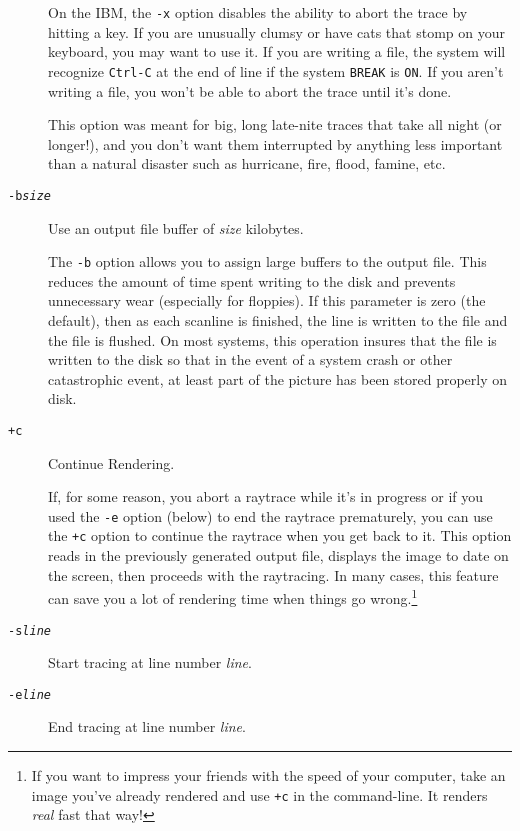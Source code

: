 \begin{description}
On the IBM, the {\tt -x} option disables the ability to abort the
trace by hitting a key.  If you are unusually clumsy or have
cats that stomp on your keyboard, you
may want to use it.  If you are writing a file, the system
will recognize {\tt Ctrl-C} at the end of line if the system {\tt BREAK}
is {\tt ON}.  If you aren't writing a file, you won't be able to
abort the trace until it's done.

This option was meant for big, long late-nite traces that take
all night (or longer!), and you don't want them interrupted by
anything less important than a natural disaster such as hurricane,
fire, flood, famine, etc.

\item[{\tt -b{\em size}}] %
Use an output file buffer of
{\em size} kilobytes.

The {\tt -b} option allows you to assign large buffers to the output
file.  This reduces the amount of time spent writing to the
disk and prevents unnecessary wear (especially for floppies). 
If this parameter is zero (the default), then as each scanline is finished,
the line is written to the file and the file is flushed.  On
most systems, this operation insures that the file is written
to the disk so that in the event of a system crash or other
catastrophic event, at least part of the picture has been
stored properly on disk.

\item[{\tt +c}] Continue Rendering.

If, for some reason, you abort a raytrace while it's in progress
or if you used the {\tt -e} option (below) to end the raytrace
prematurely, you can use the {\tt +c} option to continue the raytrace
when you get back to it.  This option reads in the previously
generated output file, displays the image to date on the screen,
then proceeds with the raytracing.  In many cases, this feature
can save you a lot of rendering time when things go wrong.\footnote{If
you want to impress your friends with the speed of your
computer, take an image you've already rendered and use {\tt +c}
in the command-line.  It renders {\em real} fast that way!}

\item[{\tt -s{\em line}}] %
Start tracing at line number {\em line}.
\noitemsep
\item[{\tt -e{\em line}}] %
End tracing at line number {\em line}.
\doitemsep


\end{description}
